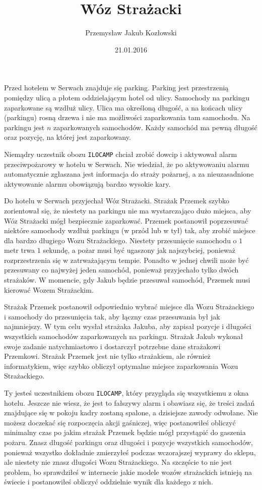 \documentclass[zad,zawodnik,utf8]{sinol}
\title{Wóz Strażacki}
\author{Przemysław Jakub Kozłowski} %
\date{21.01.2016}
\begin{document}
\begin{tasktext}%

Przed hotelem w Serwach znajduje się parking. Parking jest przestrzenią pomiędzy ulicą a płotem oddzielającym hotel od ulicy. Samochody na parkingu zaparkowane są wzdłuż ulicy. Ulica ma określoną długość, a na końcach ulicy (parkingu) rosną drzewa i nie ma możliwości zaparkowania tam samochodu. Na parkingu jest $n$ zaparkowanych samochodów. Każdy samochód ma pewną długość oraz pozycję, na której jest zaparkowany.

Niemądry uczestnik obozu \texttt{ILOCAMP} chciał zrobić dowcip i aktywował alarm przeciwpożarowy w hotelu w Serwach. Nie wiedział, że po aktywowaniu alarmu automatycznie zgłaszana jest informacja do straży pożarnej, a za nieuzasadnione aktywowanie alarmu obowiązują bardzo wysokie kary.

Do hotelu w Serwach przyjechał Wóz Strażacki. Strażak Przemek szybko zorientował się, że niestety na parkingu nie ma wystarczająco dużo miejsca, aby Wóz Strażacki mógł bezpiecznie zaparkować. Przemek postanowił poprzesuwać niektóre samochody wzdłuż parkingu (w przód lub w tył) tak, aby zrobić miejsce dla bardzo długiego Wozu Strażackiego. Niestety przesunięcie samochodu o $1$ metr trwa $1$ sekundę, a pożar musi być ugaszony jak najszybciej, ponieważ rozprzestrzenia się w zatrważającym tempie. Ponadto w jednej chwili może być przesuwany co najwyżej jeden samochód, ponieważ przyjechało tylko dwóch strażaków. W momencie, gdy Jakub będzie przesuwał samochód, Przemek musi kierować Wozem Strażackim.

Strażak Przemek postanowił odpowiednio wybrać miejsce dla Wozu Strażackiego i samochody do przesunięcia tak, aby łączny czas przesuwania był jak najmniejszy. W tym celu wysłał strażaka Jakuba, aby zapisał pozycje i długości wszystkich samochodów zaparkowanych na parkingu. Strażak Jakub wykonał swoje zadanie natychmiastowo i dostarczył potrzebne dane strażakowi Przemkowi. Strażak Przemek jest nie tylko strażakiem, ale również informatykiem, więc szybko obliczył optymalne miejsce zaparkowania Wozu Strażackiego.

Ty jesteś uczestnikiem obozu \texttt{ILOCAMP}, który przygląda się wszystkiemu z okna hotelu. Jeszcze nie wiesz, że jest to fałszywy alarm i obawiasz się, że treści zadań znajdujące się w pokoju kadry zostaną spalone, a dzisiejsze zawody odwołane. Nie możesz doczekać się rozpoczęcia akcji gaśniczej, więc postanowiłeś obliczyć minimalny czas po jakim strażak Przemek będzie mógł przystąpić do gaszenia pożaru. Znasz długość parkingu oraz długości i pozycje wszystkich samochodów, ponieważ wszystko dokładnie zmierzyłeś podczas wczorajszej wyprawy do sklepu, ale niestety nie znasz długości Wozu Strażackiego. Na szczęście to nie jest problem, bo sprawdziłeś w internecie jakie modele wozów strażackich istnieją na świecie i postanowiłeś obliczyć oddzielnie wynik dla każdego z nich.


\end{tasktext}
\end{document}
